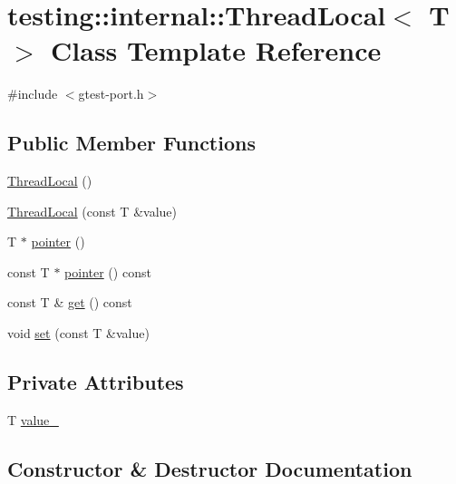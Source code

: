 \hypertarget{classtesting_1_1internal_1_1ThreadLocal}{}\section{testing\+:\+:internal\+:\+:Thread\+Local$<$ T $>$ Class Template Reference}
\label{classtesting_1_1internal_1_1ThreadLocal}


{\ttfamily \#include $<$gtest-\/port.\+h$>$}

\subsection*{Public Member Functions}
\begin{DoxyCompactItemize}
\item 
\hyperlink{classtesting_1_1internal_1_1ThreadLocal_a106f3a3ad15d08f95f9887105d2a1af5}{Thread\+Local} ()
\item 
\hyperlink{classtesting_1_1internal_1_1ThreadLocal_a85610bdfdbc93a4c56215e0aad7da870}{Thread\+Local} (const T \&value)
\item 
T $\ast$ \hyperlink{classtesting_1_1internal_1_1ThreadLocal_a882f57fed4b074de83693c0c0fe62858}{pointer} ()
\item 
const T $\ast$ \hyperlink{classtesting_1_1internal_1_1ThreadLocal_a57e45bb60e3cd94abb04fa449e9f0367}{pointer} () const
\item 
const T \& \hyperlink{classtesting_1_1internal_1_1ThreadLocal_ac56aeb97991824979bf192c63d1466f8}{get} () const
\item 
void \hyperlink{classtesting_1_1internal_1_1ThreadLocal_ab5ebc7ba07426cef7167afa2a7707eb4}{set} (const T \&value)
\end{DoxyCompactItemize}
\subsection*{Private Attributes}
\begin{DoxyCompactItemize}
\item 
T \hyperlink{classtesting_1_1internal_1_1ThreadLocal_ae0db6b57bdb752feb343ee4d935708e2}{value\+\_\+}
\end{DoxyCompactItemize}


\subsection{Constructor \& Destructor Documentation}
\mbox{\label{classtesting_1_1internal_1_1ThreadLocal_a106f3a3ad15d08f95f9887105d2a1af5}} 
